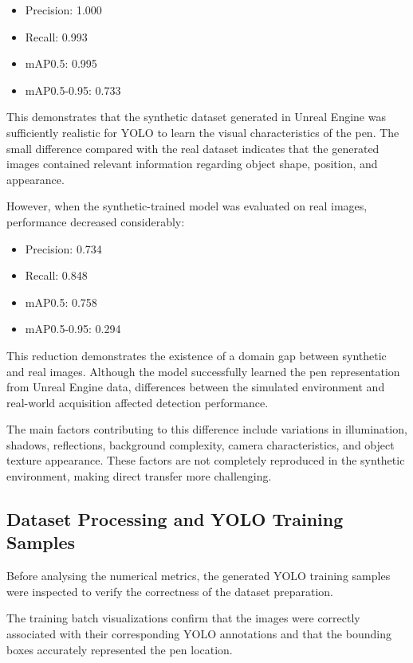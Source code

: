 \documentclass[conference,a4paper]{IEEEtran}
\begin{document}
\begin{itemize}
    \item Precision: 1.000
    \item Recall: 0.993
    \item mAP0.5: 0.995
    \item mAP0.5-0.95: 0.733
\end{itemize}

This demonstrates that the synthetic dataset generated in Unreal Engine was sufficiently realistic for YOLO to learn the visual characteristics of the pen. The small difference compared with the real dataset indicates that the generated images contained relevant information regarding object shape, position, and appearance.


However, when the synthetic-trained model was evaluated on real images, performance decreased considerably:

\begin{itemize}
    \item Precision: 0.734
    \item Recall: 0.848
    \item mAP0.5: 0.758
    \item mAP0.5-0.95: 0.294
\end{itemize}

This reduction demonstrates the existence of a domain gap between synthetic and real images. Although the model successfully learned the pen representation from Unreal Engine data, differences between the simulated environment and real-world acquisition affected detection performance.

The main factors contributing to this difference include variations in illumination, shadows, reflections, background complexity, camera characteristics, and object texture appearance. These factors are not completely reproduced in the synthetic environment, making direct transfer more challenging.


\subsection{Dataset Processing and YOLO Training Samples}

Before analysing the numerical metrics, the generated YOLO training samples were inspected to verify the correctness of the dataset preparation.

The training batch visualizations confirm that the images were correctly associated with their corresponding YOLO annotations and that the bounding boxes accurately represented the pen location.
\end{document}
